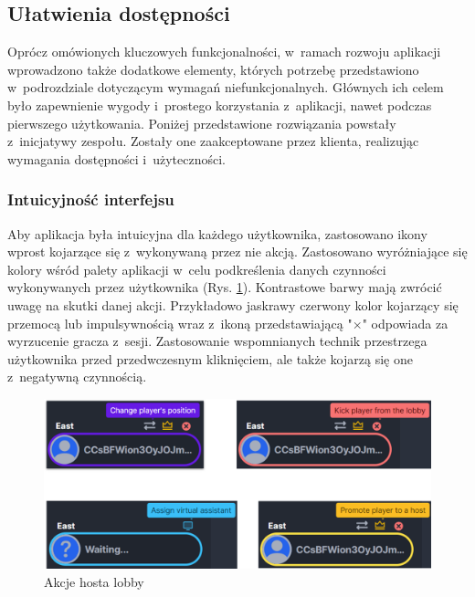 \subsection{Ułatwienia dostępności}

Oprócz omówionych kluczowych funkcjonalności, w~ramach rozwoju
aplikacji wprowadzono także dodatkowe elementy, których
potrzebę przedstawiono w~podrozdziale dotyczącym wymagań
niefunkcjonalnych. Głównych ich celem było zapewnienie
wygody i~prostego korzystania z~aplikacji, nawet podczas
pierwszego użytkowania. Poniżej przedstawione rozwiązania powstały
z~inicjatywy zespołu. Zostały one zaakceptowane przez klienta,
realizując wymagania dostępności i~użyteczności.

\subsubsection{Intuicyjność interfejsu}

Aby aplikacja była intuicyjna dla każdego użytkownika,
zastosowano ikony wprost kojarzące się z~wykonywaną
przez nie akcją. Zastosowano wyróżniające się kolory wśród palety
aplikacji w~celu podkreślenia danych czynności wykonywanych
przez użytkownika (Rys. \ref{fig:host_actions_ui}). Kontrastowe barwy mają zwrócić uwagę na
skutki danej akcji. Przykładowo jaskrawy czerwony kolor
kojarzący się przemocą lub impulsywnością wraz z~ikoną
przedstawiającą "$\times$"\xspace odpowiada za wyrzucenie gracza
z~sesji. Zastosowanie wspomnianych technik przestrzega
użytkownika przed przedwczesnym kliknięciem, ale także kojarzą
się one z~negatywną czynnością.

\begin{figure}[h!]
  \centering
  \includegraphics[width=\textwidth]{img/widoki/host_actions.png}
  \caption{Akcje hosta lobby}
  \label{fig:host_actions_ui}
\end{figure}

\FloatBarrier

